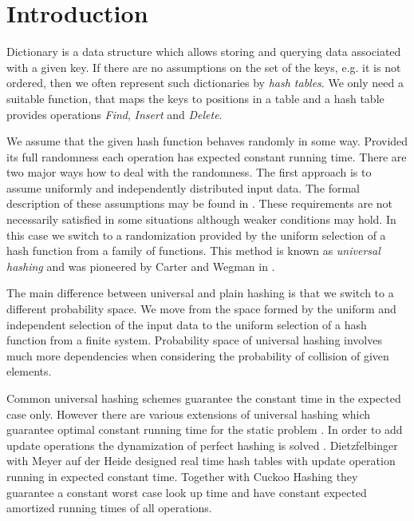 \section{Introduction}
Dictionary is a data structure which allows storing and querying data associated with a given key. If there are no assumptions on the set of the keys, e.g. it is not ordered, then we often represent such dictionaries by \emph{hash tables}. We only need a suitable function, that maps the keys to positions in a table and a hash table provides operations \emph{Find}, \emph{Insert} and \emph{Delete}. 

We assume that the given hash function behaves randomly in some way. Provided its full randomness each operation has expected constant running time. There are two major ways how to deal with the randomness. The first approach is to assume uniformly and independently distributed input data. The formal description of these assumptions may be found in \cite{DBLP:books/sp/Mehlhorn84}. These requirements are not necessarily satisfied in some situations although weaker conditions may hold. In this case we switch to a randomization provided by the uniform selection of a hash function from a family of functions. This method is known as \emph{universal hashing} and was pioneered by Carter and Wegman in \cite{DBLP:journals/jcss/CarterW79}. 

The main difference between universal and plain hashing is that we switch to a different probability space. We move from the space formed by the uniform and independent selection of the input data to the uniform selection of a hash function from a finite system. Probability space of universal hashing involves much more dependencies when considering the probability of collision of given elements.

Common universal hashing schemes guarantee the constant time in the expected case only. However there are various extensions of universal hashing which guarantee optimal constant running time for the static problem \cite{Fredman:1984:SST:828.1884}. In order to add update operations the dynamization of perfect hashing is solved \cite{DBLP:journals/siamcomp/DietzfelbingerKMHRT94}. Dietzfelbinger with Meyer auf der Heide designed real time hash tables \cite{DBLP:conf/icalp/DietzfelbingerH90} with update operation running in expected constant time. Together with Cuckoo Hashing \cite{DBLP:conf/esa/PaghR01} they guarantee a constant worst case look up time and have constant expected amortized running times of all operations.


